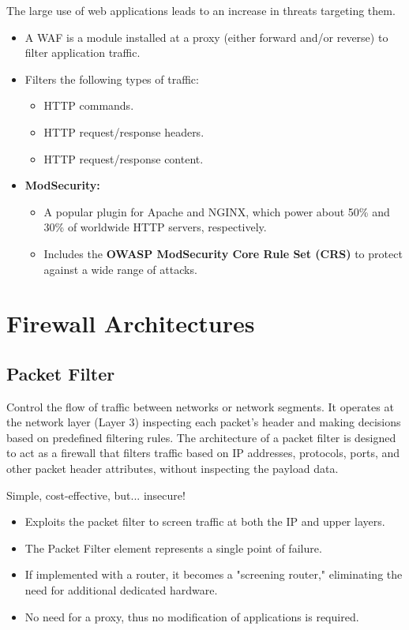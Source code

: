 The large use of web applications leads to an increase in threats targeting them.
\begin{itemize}
    \item A WAF is a module installed at a proxy (either forward and/or reverse) to filter application traffic.
    \item Filters the following types of traffic:
    \begin{itemize}
        \item HTTP commands.
        \item HTTP request/response headers.
        \item HTTP request/response content.
    \end{itemize}
    \item \textbf{ModSecurity:}
    \begin{itemize}
        \item A popular plugin for Apache and NGINX, which power about 50\% and 30\% of worldwide HTTP servers, respectively.
        \item Includes the \textbf{OWASP ModSecurity Core Rule Set (CRS)} to protect against a wide range of attacks.
    \end{itemize}
\end{itemize}

\section{Firewall Architectures}
\subsection{Packet Filter}
Control the flow of traffic between networks or network segments. It operates at the network layer (Layer 3) inspecting each packet’s header and making decisions based on predefined filtering rules. The architecture of a packet filter is designed to act as a firewall that filters traffic based on IP addresses, protocols, ports, and other packet header attributes, without inspecting the payload data.

\begin{tcolorbox}[colback=red!10!white, colframe=red!70!black, coltitle=white, title=Beware]
    Simple, cost-effective, but... insecure!
\end{tcolorbox}

\begin{itemize}
    \item Exploits the packet filter to screen traffic at both the IP and upper layers.
    \item The Packet Filter element represents a single point of failure.
    \item If implemented with a router, it becomes a "screening router," eliminating the need for additional dedicated hardware.
    \item No need for a proxy, thus no modification of applications is required.
\end{itemize}

